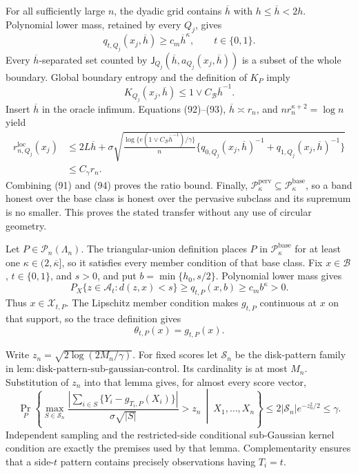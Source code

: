 For all sufficiently large \(n\), the dyadic grid contains
\(\overline h\) with \(h\le\overline h<2h\).  Polynomial lower mass,
retained by every \(Q_j\), gives
\[
 q_{t,Q_j}(x_j,\overline h)\ge c_m\overline h^\kappa,
 \qquad t\in\{0,1\}.
 \tag{92}
\]
Every \(\overline h\)-separated set counted by
\(\mathsf J_{Q_j}(\overline h,a_{Q_j}(x_j,\overline h))\) is a subset
of the whole boundary.  Global boundary entropy and the definition of
\(K_P\) imply
\[
 K_{Q_j}(x_j,\overline h)
 \le1\vee C_{\mathcal B}\overline h^{-1}.
 \tag{93}
\]
Insert \(\overline h\) in the oracle infimum.  Equations (92)--(93),
\(\overline h\asymp r_n\), and \(nr_n^{\kappa+2}=\log n\) yield
\[
 \begin{aligned}
 r_{n,Q_j}^{\mathrm{loc}}(x_j)
 &\le2L\overline h+
 \sigma\sqrt{\frac{\log\{e(1\vee C_{\mathcal B}\overline h^{-1})/
 \gamma\}}n
 \{q_{0,Q_j}(x_j,\overline h)^{-1}
   +q_{1,Q_j}(x_j,\overline h)^{-1}\}}\\
 &\le C_\gamma r_n.
 \end{aligned}
 \tag{94}
\]
Combining (91) and (94) proves the ratio bound.  Finally,
\(\mathcal P_{\kappa}^{\mathrm{perv}}\subseteq
\mathcal P_{\kappa}^{\mathrm{base}}\), so a band honest over the base
class is honest over the pervasive subclass and its supremum is no
smaller.  This proves the stated transfer without any use of circular
geometry.

Let \(P\in\mathcal P_n(\Lambda_n)\).  The triangular-union definition
places \(P\) in \(\mathcal P_{\kappa}^{\mathrm{base}}\) for at least one
\(\kappa\in(2,\overline\kappa]\), so it satisfies every member condition
of that base class.  Fix \(x\in\mathcal B\), \(t\in\{0,1\}\), and
\(s>0\), and put \(b=\min\{h_0,s/2\}\).  Polynomial lower mass gives
\[
 P_X\{z\in\mathcal A_t:d(z,x)<s\}
 \ge q_{t,P}(x,b)\ge c_mb^\kappa>0.
 \tag{95}
\]
Thus \(x\in\mathcal X_{t,P}\).  The Lipschitz member condition makes
\(g_{t,P}\) continuous at \(x\) on that support, so the trace definition
gives
\[
 \theta_{t,P}(x)=g_{t,P}(x).
 \tag{96}
\]

Write \(z_n=\sqrt{2\log(2M_n/\gamma)}\).  For fixed scores let
\(\mathscr S_n\) be the disk-pattern family in
\(\mathrm{lem:disk\text{-}pattern\text{-}sub\text{-}gaussian\text{-}control}\).
Its cardinality is at most \(M_n\).  Substitution of \(z_n\) into that
lemma gives, for almost every score vector,
\[
 \Pr_P\!\left\{
 \max_{S\in\mathscr S_n}
 \frac{|\sum_{i\in S}\{Y_i-g_{T_i,P}(X_i)\}|}
      {\sigma\sqrt{|S|}}>z_n
 \ \middle|\ X_1,\ldots,X_n\right\}
 \le2|\mathscr S_n|e^{-z_n^2/2}\le\gamma.
 \tag{97}
\]
Independent sampling and the restricted-side conditional sub-Gaussian
kernel condition are exactly the premises used by that lemma.
Complementarity ensures that a side-\(t\) pattern contains precisely
observations having \(T_i=t\).

